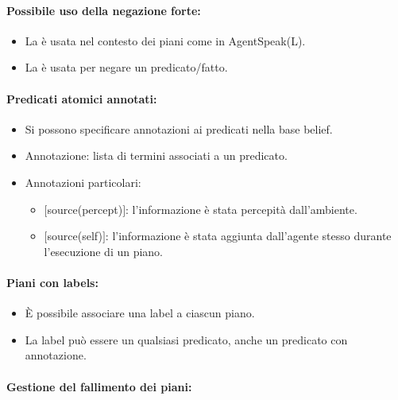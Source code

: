 
\paragraph{Possibile uso della negazione forte:}

\begin{itemize}
  \item La  è usata nel contesto dei piani come in AgentSpeak(L). 
  \item La  è usata per negare un predicato/fatto.
\end{itemize}

\paragraph{Predicati atomici annotati:}

\begin{itemize}
  \item Si possono specificare annotazioni ai predicati nella base belief. 
  \item Annotazione: lista di termini associati a un predicato. 
  \item Annotazioni particolari:
    \begin{itemize}
      \item $[$source(percept)$]$: l'informazione è stata percepità dall'ambiente. 
      \item $[$source(self)$]$: l'informazione è stata aggiunta dall'agente stesso durante l'esecuzione di un piano. 
    \end{itemize}
\end{itemize}

\paragraph{Piani con labels:}

\begin{itemize}
  \item È possibile associare una label a ciascun piano. 
  \item La label può essere un qualsiasi predicato, anche un predicato con annotazione.
\end{itemize}

\paragraph{Gestione del fallimento dei piani:}


